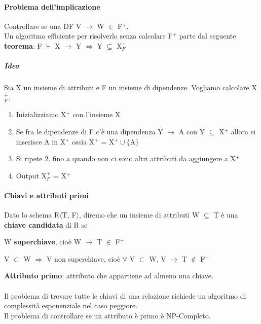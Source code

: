 \documentclass[10pt]{book}
\begin{document}
\paragraph{Problema dell'implicazione} Controllare se una DF V $\rightarrow$ W $\in$ F$^+$.\\
Un algoritmo efficiente per risolverlo senza calcolare F$^+$ parte dal seguente \textbf{teorema}: F $\vdash$ X $\rightarrow$ Y $\Leftrightarrow$ Y $\subseteq$ X$_F^+$
\subparagraph{Idea} Sia X un insieme di attributi e F un insieme di dipendenze. Vogliamo calcolare X$_F^+$.
\begin{enumerate}
	\item Inizializziamo X$^+$ con l'insieme X
	\item Se fra le dipendenze di F c'è una dipendenza Y $\rightarrow$ A con Y $\subseteq$ X$^+$ allora si inserisce A in X$^+$ ossia X$^+$ = X$^+\cup\{$A$\}$
	\item Si ripete 2. fino a quando non ci sono altri attributi da aggiungere a X$^+$
	\item Output X$_F^+$ = X$^+$
\end{enumerate}
\paragraph{Chiavi e attributi primi} Dato lo schema R$\langle$T, F$\rangle$, diremo che un insieme di attributi W $\subseteq$ T è una \textbf{chiave candidata} di R se
\begin{list}{}{}
	\item W \textbf{superchiave}, cioè W $\rightarrow$ T $\in$ F$^+$
	\item V $\subset$ W $\Rightarrow$ V non superchiave, cioè $\forall$ V $\subset$ W, V $\rightarrow$ T $\not\in$ F$^+$
\end{list}
\textbf{Attributo primo}: attributo che appartiene ad almeno una chiave.\\\\
Il problema di trovare tutte le chiavi di una relazione richiede un algoritmo di complessità esponenziale nel caso peggiore.\\
Il problema di controllare se un attributo è primo è NP-Completo.
\pagebreak
\end{document}

